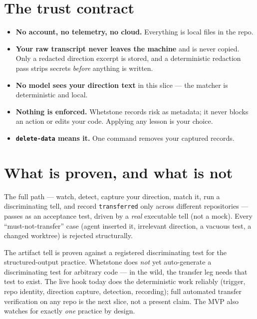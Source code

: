 \documentclass[11pt]{article}
\newcommand{\code}[1]{\textcolor{ink}{\texttt{#1}}}
\begin{document}
\section{The trust contract}

\begin{itemize}
\item \textbf{No account, no telemetry, no cloud.} Everything is local files in the repo.
\item \textbf{Your raw transcript never leaves the machine} and is never copied. Only a
      redacted direction excerpt is stored, and a deterministic redaction pass strips
      secrets \emph{before} anything is written.
\item \textbf{No model sees your direction text} in this slice --- the matcher is
      deterministic and local.
\item \textbf{Nothing is enforced.} Whetstone records risk as metadata; it never blocks an
      action or edits your code. Applying any lesson is your choice.
\item \textbf{\code{delete-data} means it.} One command removes your captured records.
\end{itemize}

\section{What is proven, and what is not}

\begin{ok}
The full path --- watch, detect, capture your direction, match it, run a discriminating
tell, and record \code{transferred} only across different repositories --- passes as an
acceptance test, driven by a \emph{real} executable tell (not a mock). Every ``must-not-transfer''
case (agent inserted it, irrelevant direction, a vacuous test, a changed worktree) is
rejected structurally.
\end{ok}

\begin{boundary}
The artifact tell is proven against a registered discriminating test for the structured-output
practice. Whetstone does \emph{not} yet auto-generate a discriminating test for arbitrary
code --- in the wild, the transfer leg needs that test to exist. The live hook today does the
deterministic work reliably (trigger, repo identity, direction capture, detection,
recording); full automated transfer verification on any repo is the next slice, not a
present claim. The MVP also watches for exactly \emph{one} practice by design.
\end{boundary}
\end{document}
